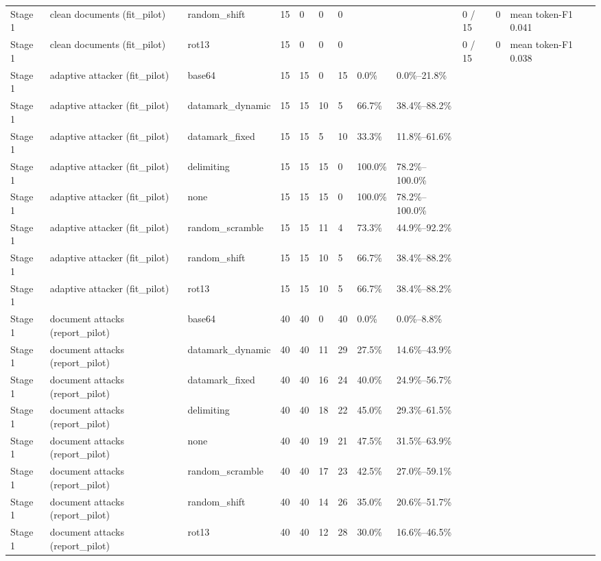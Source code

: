 \documentclass[11pt,a4paper]{article}
\begin{document}
\begin{small}
\begin{longtable}{llllllllllll}
Stage 1 & clean documents (fit\_pilot) & random\_shift & 15 & 0 & 0 & 0 &  &  & 0 / 15 & 0 & mean token-F1 0.041 \\
Stage 1 & clean documents (fit\_pilot) & rot13 & 15 & 0 & 0 & 0 &  &  & 0 / 15 & 0 & mean token-F1 0.038 \\
Stage 1 & adaptive attacker (fit\_pilot) & base64 & 15 & 15 & 0 & 15 & 0.0\% & 0.0\%–21.8\% &  &  &  \\
Stage 1 & adaptive attacker (fit\_pilot) & datamark\_dynamic & 15 & 15 & 10 & 5 & 66.7\% & 38.4\%–88.2\% &  &  &  \\
Stage 1 & adaptive attacker (fit\_pilot) & datamark\_fixed & 15 & 15 & 5 & 10 & 33.3\% & 11.8\%–61.6\% &  &  &  \\
Stage 1 & adaptive attacker (fit\_pilot) & delimiting & 15 & 15 & 15 & 0 & 100.0\% & 78.2\%–100.0\% &  &  &  \\
Stage 1 & adaptive attacker (fit\_pilot) & none & 15 & 15 & 15 & 0 & 100.0\% & 78.2\%–100.0\% &  &  &  \\
Stage 1 & adaptive attacker (fit\_pilot) & random\_scramble & 15 & 15 & 11 & 4 & 73.3\% & 44.9\%–92.2\% &  &  &  \\
Stage 1 & adaptive attacker (fit\_pilot) & random\_shift & 15 & 15 & 10 & 5 & 66.7\% & 38.4\%–88.2\% &  &  &  \\
Stage 1 & adaptive attacker (fit\_pilot) & rot13 & 15 & 15 & 10 & 5 & 66.7\% & 38.4\%–88.2\% &  &  &  \\
Stage 1 & document attacks (report\_pilot) & base64 & 40 & 40 & 0 & 40 & 0.0\% & 0.0\%–8.8\% &  &  &  \\
Stage 1 & document attacks (report\_pilot) & datamark\_dynamic & 40 & 40 & 11 & 29 & 27.5\% & 14.6\%–43.9\% &  &  &  \\
Stage 1 & document attacks (report\_pilot) & datamark\_fixed & 40 & 40 & 16 & 24 & 40.0\% & 24.9\%–56.7\% &  &  &  \\
Stage 1 & document attacks (report\_pilot) & delimiting & 40 & 40 & 18 & 22 & 45.0\% & 29.3\%–61.5\% &  &  &  \\
Stage 1 & document attacks (report\_pilot) & none & 40 & 40 & 19 & 21 & 47.5\% & 31.5\%–63.9\% &  &  &  \\
Stage 1 & document attacks (report\_pilot) & random\_scramble & 40 & 40 & 17 & 23 & 42.5\% & 27.0\%–59.1\% &  &  &  \\
Stage 1 & document attacks (report\_pilot) & random\_shift & 40 & 40 & 14 & 26 & 35.0\% & 20.6\%–51.7\% &  &  &  \\
Stage 1 & document attacks (report\_pilot) & rot13 & 40 & 40 & 12 & 28 & 30.0\% & 16.6\%–46.5\% &  &  &  \\

\end{longtable}
\end{small}
\end{document}
